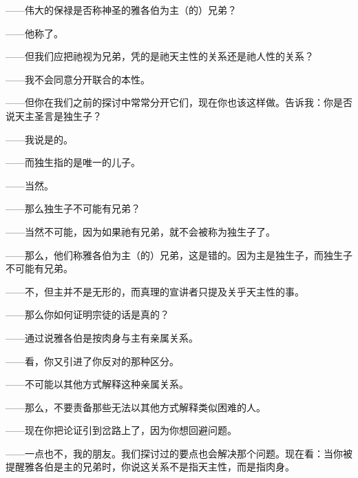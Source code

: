 ——伟大的保禄是否称神圣的雅各伯为主（的）兄弟？\par

——他称了。\par

——但我们应把祂视为兄弟，凭的是祂天主性的关系还是祂人性的关系？\par

——我不会同意分开联合的本性。\par

——但你在我们之前的探讨中常常分开它们，现在你也该这样做。告诉我：你是否说天主圣言是独生子？\par

——我说是的。\par

——而独生指的是唯一的儿子。\par

——当然。\par

——那么独生子不可能有兄弟？\par

——当然不可能，因为如果祂有兄弟，就不会被称为独生子了。\par

——那么，他们称雅各伯为主（的）兄弟，这是错的。因为主是独生子，而独生子不可能有兄弟。\par

——不，但主并不是无形的，而真理的宣讲者只提及关乎天主性的事。\par

——那么你如何证明宗徒的话是真的？\par

——通过说雅各伯是按肉身与主有亲属关系。\par

——看，你又引进了你反对的那种区分。\par

——不可能以其他方式解释这种亲属关系。\par

——那么，不要责备那些无法以其他方式解释类似困难的人。\par

——现在你把论证引到岔路上了，因为你想回避问题。\par

——一点也不，我的朋友。我们探讨过的要点也会解决那个问题。现在看：当你被提醒雅各伯是主的兄弟时，你说这关系不是指天主性，而是指肉身。\par

